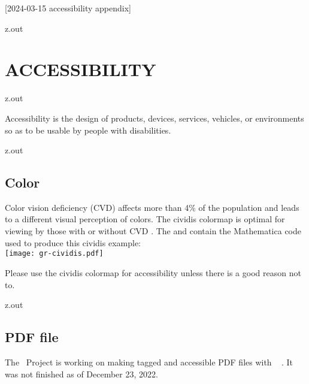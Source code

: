 [2024-03-15 accessibility appendix]

\begin{VerbatimOut}{z.out}
\chapter{ACCESSIBILITY}
\end{VerbatimOut}

\MyIO


\begin{VerbatimOut}{z.out}

Accessibility is the design of products,
devices,
services,
vehicles,
or environments
so as to be usable by people with disabilities.
\cite{wikipedia-accessibility}
\end{VerbatimOut}

\MyIO


\begin{VerbatimOut}{z.out}


\section{Color}

Color vision deficiency (CVD) affects more than 4\% of the population
and leads to a different visual perception of colors.
The cividis%
colormap is optimal
for viewing
by those with or without CVD
\cite{nunez2018}.
The
\cite{senn2022}
and
\cite{senn2022b}
contain the Mathematica code used to produce this cividis example:\\[\baselineskip]
\texttt{[image: gr-cividis.pdf]}
\end{VerbatimOut}

Please use the cividis colormap for accessibility
unless there is a good reason not to.
\MyIO


\begin{VerbatimOut}{z.out}


\section{PDF file}

The \LaTeXLogo\ Project
\cite{thelatexproject2023}
is working on making tagged
and accessible PDF files with \LaTeXLogo\ %
\cite{mittlebach2022}.
It was not finished as of December 23, 2022.
\end{VerbatimOut}

\MyIO
